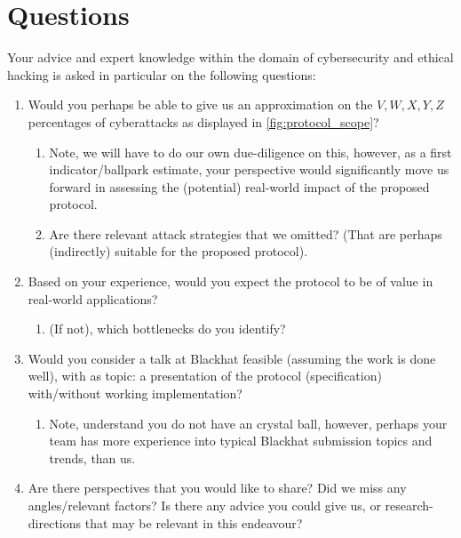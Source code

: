 \section{Questions}
\label{sec:questions}
Your advice and expert knowledge within the domain of cybersecurity and ethical hacking is asked in particular on the following questions:
\begin{enumerate}
    \item Would you perhaps be able to give us an approximation on the $V,W,X,Y,Z$ percentages of cyberattacks as displayed in \cref{fig:protocol_scope}? 
    \begin{enumerate}
        \item Note, we will have to do our own due-diligence on this, however, as a first indicator/ballpark estimate, your perspective would significantly move us forward in assessing the (potential) real-world impact of the proposed protocol. 
        \item Are there relevant attack strategies that we omitted? (That are perhaps (indirectly) suitable for the proposed protocol).
    \end{enumerate}
    \item Based on your experience, would you expect the protocol to be of value in real-world applications?
    \begin{enumerate}
        \item (If not), which bottlenecks do you identify?
    \end{enumerate}
    \item Would you consider a talk at Blackhat feasible (assuming the work is done well), with as topic: a presentation of the protocol (specification) with/without working implementation?
    \begin{enumerate}
        \item Note, understand you do not have an crystal ball, however, perhaps your team has more experience into typical Blackhat submission topics and trends, than us.
    \end{enumerate}
    \item Are there perspectives that you would like to share? Did we miss any angles/relevant factors? Is there any advice you could give us, or research-directions that may be relevant in this endeavour?
\end{enumerate}